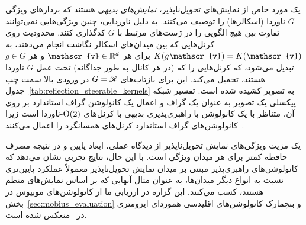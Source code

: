 یک مورد خاص از نمایش‌های تحویل‌ناپذیر، \emph{نمایش‌های بدیهی} هستند که بردارهای ویژگی $G$-ناوردا (اسکالرها) را توصیف می‌کنند.
به دلیل ناوردایی، چنین ویژگی‌هایی نمی‌توانند تفاوت بین هیچ الگویی را در ژست‌های مرتبط با $G$ کدگذاری کنند.
محدودیت روی کرنل‌هایی که بین میدان‌های اسکالر نگاشت انجام می‌دهند، به $K(g\mkern1mu \mathscr{v}) = K(\mathscr{v})$ برای هر $\mathscr{v} \in \R^d$ و هر $g\in G$ تبدیل می‌شود، که کرنل‌هایی را که (در هر کانال به طور جداگانه) تحت عمل $G$ ناوردا هستند، تحمیل می‌کند.
این برای بازتاب‌های $G=\mathscr{R}$ در ورودی بالا سمت چپ جدول~\ref{tab:reflection_steerable_kernels} به تصویر کشیده شده است.
تفسیر شبکه پیکسلی یک تصویر به عنوان یک گراف و اعمال یک کانولوشن گراف استاندارد بر روی آن، متناظر با یک کانولوشن با راهبری‌پذیری بدیهی با کرنل‌های $\operatorname{O}(2)$-ناوردا است زیرا کانولوشن‌های گراف استاندارد کرنل‌های همسانگرد را اعمال می‌کنند~\cite{khasanova2018isometric}.

یک مزیت ویژگی‌های نمایش تحویل‌ناپذیر از دیدگاه عملی، ابعاد پایین و در نتیجه مصرف حافظه کمتر برای هر میدان ویژگی است.
با این حال، نتایج تجربی نشان می‌دهد که کانولوشن‌های راهبری‌پذیر مبتنی بر میدان نمایش تحویل‌ناپذیر معمولاً عملکرد پایین‌تری نسبت به انواع دیگر میدان‌ها، به عنوان مثال آنهایی که بر اساس نمایش‌های منظم هستند، کسب می‌کنند.
این گزاره در ارزیابی ما از کانولوشن‌های موبیوس در بخش~\ref{sec:mobius_evaluation} و بنچمارک کانولوشن‌های اقلیدسی هموردای ایزومتری در~\cite{Weiler2019_E2CNN} منعکس شده است.




